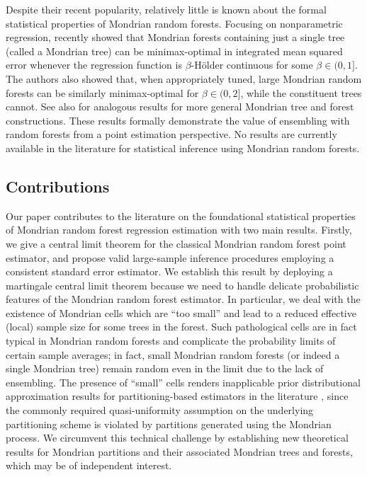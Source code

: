 Despite their recent popularity, relatively little is
known about the formal
statistical properties of Mondrian random forests.
Focusing on nonparametric regression, \citet{mourtada2020minimax}
recently showed that Mondrian forests containing just a single tree
(called a Mondrian tree) can be minimax-optimal in integrated mean squared
error
whenever the regression function is
$\beta$-H{\"o}lder continuous for some $\beta \in (0, 1]$.
The authors also showed that, when appropriately tuned,
large Mondrian random forests can be similarly
minimax-optimal for $\beta \in (0, 2]$, while the constituent trees cannot.
See also \citet{o2022stochastic} for analogous results for more general
Mondrian tree and forest constructions.
These results formally demonstrate the value of ensembling with random forests
from a point estimation perspective.
No results are currently available in the literature for
statistical inference using Mondrian random forests.

\subsection{Contributions}

Our paper contributes to the literature on
the foundational statistical properties
of Mondrian random forest regression estimation with two main results.
Firstly, we give a central limit theorem
for the classical Mondrian random forest point estimator,
and propose valid large-sample inference procedures employing a consistent
standard error estimator.
We establish this result by
deploying a martingale central limit theorem
\citep[Theorem~3.2]{hall2014martingale} because we need to handle delicate
probabilistic features of the Mondrian random forest estimator.
In particular, we deal with the existence of
Mondrian cells which are ``too small''
and lead to a reduced effective (local) sample size
for some trees in the forest.
Such pathological cells are in fact typical in Mondrian random forests and
complicate the probability limits of certain sample averages; in fact, small
Mondrian random forests (or indeed a single Mondrian tree) remain random even
in the limit due to the lack of ensembling. The presence of ``small'' cells
renders inapplicable prior distributional approximation results for
partitioning-based estimators in the literature
\citep{huang2003local,cattaneo2020large}, since the commonly required
quasi-uniformity assumption on the underlying partitioning scheme is violated
by partitions generated using the Mondrian process. We circumvent this
technical challenge by establishing new theoretical results for Mondrian
partitions and their associated Mondrian trees and forests, which may be of
independent interest.

